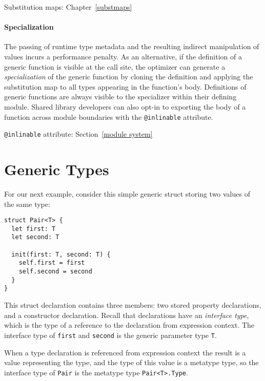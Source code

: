 \documentclass[a4paper,headsepline,bibliography=totoc,toc=flat,fleqn,twoside=semi]{scrbook}
\theoremstyle{definition}
\theoremstyle{definition}
\theoremstyle{definition}
\begin{document}
\begin{MoreDetails}
\item Substitution maps: Chapter~\ref{substmaps}
\end{MoreDetails}

\paragraph{Specialization} The passing of runtime type metadata and the resulting indirect manipulation of values incurs a performance penalty. As an alternative, if the definition of a generic function is visible at the call site, the optimizer can generate a \emph{specialization} of the generic function by cloning the definition and applying the substitution map to all types appearing in the function's body. Definitions of generic functions are always visible to the specializer within their defining module. Shared library developers can also opt-in to exporting the body of a function across module boundaries with the \texttt{@inlinable} attribute.

\begin{MoreDetails}
\item \texttt{@inlinable} attribute: Section~\ref{module system}
\end{MoreDetails}

\section{Generic Types}

For our next example, consider this simple generic struct storing two values of the same type:
\begin{Verbatim}
struct Pair<T> {
  let first: T
  let second: T

  init(first: T, second: T) {
    self.first = first
    self.second = second
  }
}
\end{Verbatim}
This struct declaration contains three members: two stored property declarations, and a constructor declaration. Recall that declarations have an \emph{interface type}, which is the type of a reference to the declaration from expression context. The interface type of \texttt{first} and \texttt{second} is the generic parameter type \texttt{T}.

When a type declaration is referenced from expression context the result is a value representing the type, and the type of this value is a metatype type, so the interface type of \texttt{Pair} is the metatype type \texttt{Pair<T>.Type}.
\end{document}

